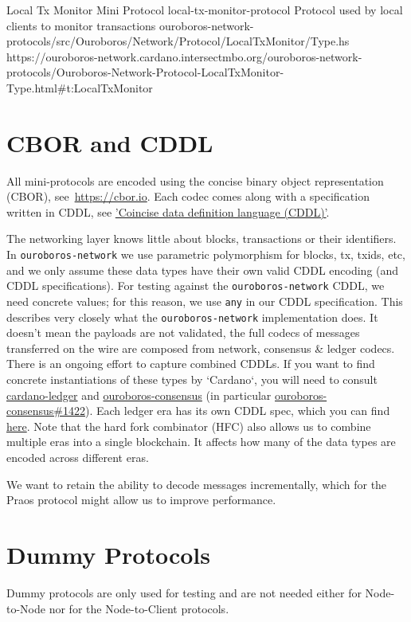 \miniEntry
    {Local Tx Monitor Mini Protocol}
    {local-tx-monitor-protocol}
    {Protocol used by local clients to monitor transactions}
    {ouroboros-network-protocols/src/Ouroboros/Network/Protocol/LocalTxMonitor/Type.hs}
    {https://ouroboros-network.cardano.intersectmbo.org/ouroboros-network-protocols/Ouroboros-Network-Protocol-LocalTxMonitor-Type.html\#t:LocalTxMonitor}


\section{CBOR and CDDL}
All mini-protocols are encoded using the concise binary object representation
(CBOR), see~\url{https://cbor.io}.  Each codec comes along with a specification
written in CDDL,
see \href{https://cbor-wg.github.io/cddl/draft-ietf-cbor-cddl.html}{'Coincise
data definition language (CDDL)'}.

The networking layer knows little about blocks, transactions or
their identifiers.  In \texttt{ouroboros-network} we use parametric
polymorphism for blocks, tx, txids, etc, and we only assume these data types have their own valid CDDL
encoding (and CDDL specifications).  For testing against the \texttt{ouroboros-network} CDDL, we need
concrete values; for this reason, we use \texttt{any} in our CDDL specification.
This describes very closely what the \texttt{ouroboros-network} implementation
does.  It doesn't mean the payloads are not validated, the full codecs of
messages transferred on the wire are composed from network, consensus \& ledger
codecs.   There is an ongoing effort to capture combined CDDLs.  If you want to
find concrete instantiations of these types by `Cardano`, you will need to
consult
\href{https://github.com/intersectmbo/cardano-ledger}{cardano-ledger} and
\href{https://github.com/intersectmbo/ouroboros-consensus}{ouroboros-consensus} (in particular \href{https://github.com/IntersectMBO/ouroboros-consensus/pull/1422}{ouroboros-consensus\#1422}).
Each ledger era has its own CDDL spec, which you can find
\href{https://github.com/intersectmbo/cardano-ledger#cardano-ledger}{here}.
Note that the hard fork combinator (HFC) also allows us to
combine multiple eras into a single blockchain.  It affects how many of the
data types are encoded across different eras.

We want to retain the ability to decode messages incrementally, which for the
Praos protocol might allow us to improve performance.

\section{Dummy Protocols}
Dummy protocols are only used for testing and are not needed either for
Node-to-Node nor for the Node-to-Client protocols.
